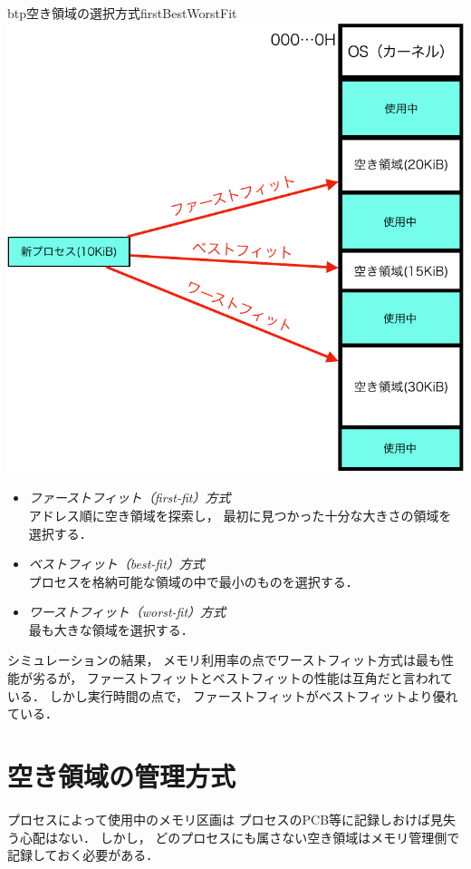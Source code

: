 \begin{myfig}{btp}{空き領域の選択方式}{firstBestWorstFit}
  \includegraphics[scale=0.66]{Fig/firstBestWorstFit-crop.pdf}
\end{myfig}

\begin{itemize}
\item \emph{ファーストフィット（first-fit）方式}\\
  アドレス順に空き領域を探索し，
  最初に見つかった十分な大きさの領域を選択する．
\item \emph{ベストフィット（best-fit）方式}\\
  プロセスを格納可能な領域の中で最小のものを選択する．
\item \emph{ワーストフィット（worst-fit）方式}\\
  最も大きな領域を選択する．
\end{itemize}

シミュレーションの結果，
メモリ利用率の点でワーストフィット方式は最も性能が劣るが，
ファーストフィットとベストフィットの性能は互角だと言われている．
しかし実行時間の点で，
ファーストフィットがベストフィットより優れている\cite{MemoryAllocation}．

\section{空き領域の管理方式}
プロセスによって使用中のメモリ区画は
プロセスのPCB等に記録しおけば見失う心配はない．
しかし，
どのプロセスにも属さない空き領域はメモリ管理側で記録しておく必要がある．

